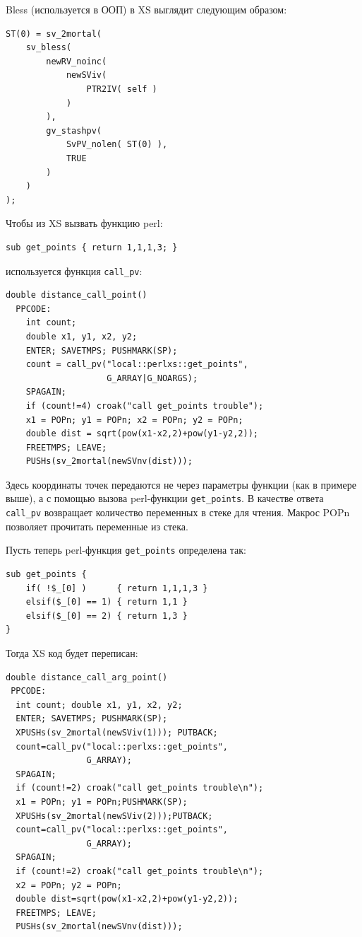 Bless (используется в ООП) в XS выглядит следующим образом:
\begin{verbatim}
ST(0) = sv_2mortal(
    sv_bless(
        newRV_noinc(
            newSViv(
                PTR2IV( self )
            )
        ),
        gv_stashpv(
            SvPV_nolen( ST(0) ),
            TRUE
        )
    )
);
\end{verbatim}

Чтобы из XS вызвать функцию perl:
\begin{verbatim}
sub get_points { return 1,1,1,3; }
\end{verbatim}
используется функция \verb|call_pv|:
\begin{verbatim}
double distance_call_point()
  PPCODE:
    int count;
    double x1, y1, x2, y2;
    ENTER; SAVETMPS; PUSHMARK(SP);
    count = call_pv("local::perlxs::get_points",
                    G_ARRAY|G_NOARGS);
    SPAGAIN;
    if (count!=4) croak("call get_points trouble");
    x1 = POPn; y1 = POPn; x2 = POPn; y2 = POPn;
    double dist = sqrt(pow(x1-x2,2)+pow(y1-y2,2));
    FREETMPS; LEAVE;
    PUSHs(sv_2mortal(newSVnv(dist)));
\end{verbatim}
Здесь координаты точек передаются не через параметры функции (как в примере выше), а с помощью вызова perl-функции \verb|get_points|. В качестве ответа \verb|call_pv| возвращает количество переменных в стеке для чтения. Макрос POPn позволяет прочитать переменные из стека.

Пусть теперь perl-функция \verb|get_points| определена так:
\begin{verbatim}
sub get_points {
    if( !$_[0] )      { return 1,1,1,3 }
    elsif($_[0] == 1) { return 1,1 }
    elsif($_[0] == 2) { return 1,3 }
}
\end{verbatim}
Тогда XS код будет переписан:
\begin{verbatim}
double distance_call_arg_point()
 PPCODE:
  int count; double x1, y1, x2, y2;
  ENTER; SAVETMPS; PUSHMARK(SP);
  XPUSHs(sv_2mortal(newSViv(1))); PUTBACK;
  count=call_pv("local::perlxs::get_points",
                G_ARRAY);
  SPAGAIN;
  if (count!=2) croak("call get_points trouble\n");
  x1 = POPn; y1 = POPn;PUSHMARK(SP);
  XPUSHs(sv_2mortal(newSViv(2)));PUTBACK;
  count=call_pv("local::perlxs::get_points",
                G_ARRAY);
  SPAGAIN;
  if (count!=2) croak("call get_points trouble\n");
  x2 = POPn; y2 = POPn;
  double dist=sqrt(pow(x1-x2,2)+pow(y1-y2,2));
  FREETMPS; LEAVE;
  PUSHs(sv_2mortal(newSVnv(dist)));
\end{verbatim}

